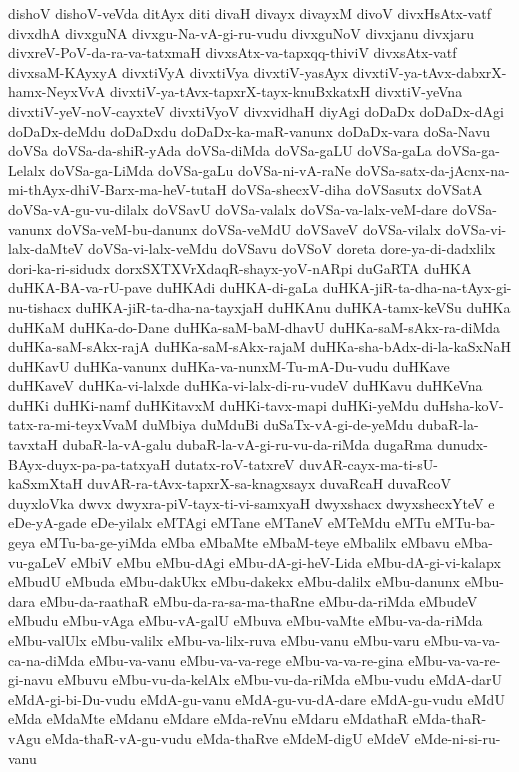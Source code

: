 {dishoV
dishoV-veVda
ditAyx
diti
divaH
divayx
divayxM
divoV
divxHsAtx-vatf
divxdhA
divxguNA
divxgu-Na-vA-gi-ru-vudu
divxguNoV
divxjanu
divxjaru
divxreV-PoV-da-ra-va-tatxmaH
divxsAtx-va-tapxqq-thiviV
divxsAtx-vatf
divxsaM-KAyxyA
divxtiVyA
divxtiVya
divxtiV-yasAyx
divxtiV-ya-tAvx-dabxrX-hamx-NeyxVvA
divxtiV-ya-tAvx-tapxrX-tayx-knuBxkatxH
divxtiV-yeVna
divxtiV-yeV-noV-cayxteV
divxtiVyoV
divxvidhaH
diyAgi
doDaDx
doDaDx-dAgi
doDaDx-deMdu
doDaDxdu
doDaDx-ka-maR-vanunx
doDaDx-vara
doSa-Navu
doVSa
doVSa-da-shiR-yAda
doVSa-diMda
doVSa-gaLU
doVSa-gaLa
doVSa-ga-Lelalx
doVSa-ga-LiMda
doVSa-gaLu
doVSa-ni-vA-raNe
doVSa-satx-da-jAcnx-na-mi-thAyx-dhiV-Barx-ma-heV-tutaH
doVSa-shecxV-diha
doVSasutx
doVSatA
doVSa-vA-gu-vu-dilalx
doVSavU
doVSa-valalx
doVSa-va-lalx-veM-dare
doVSa-vanunx
doVSa-veM-bu-danunx
doVSa-veMdU
doVSaveV
doVSa-vilalx
doVSa-vi-lalx-daMteV
doVSa-vi-lalx-veMdu
doVSavu
doVSoV
doreta
dore-ya-di-dadxlilx
dori-ka-ri-sidudx
dorxSXTXVrXdaqR-shayx-yoV-nARpi
duGaRTA
duHKA
duHKA-BA-va-rU-pave
duHKAdi
duHKA-di-gaLa
duHKA-jiR-ta-dha-na-tAyx-gi-nu-tishacx
duHKA-jiR-ta-dha-na-tayxjaH
duHKAnu
duHKA-tamx-keVSu
duHKa
duHKaM
duHKa-do-Dane
duHKa-saM-baM-dhavU
duHKa-saM-sAkx-ra-diMda
duHKa-saM-sAkx-rajA
duHKa-saM-sAkx-rajaM
duHKa-sha-bAdx-di-la-kaSxNaH
duHKavU
duHKa-vanunx
duHKa-va-nunxM-Tu-mA-Du-vudu
duHKave
duHKaveV
duHKa-vi-lalxde
duHKa-vi-lalx-di-ru-vudeV
duHKavu
duHKeVna
duHKi
duHKi-namf
duHKitavxM
duHKi-tavx-mapi
duHKi-yeMdu
duHsha-koV-tatx-ra-mi-teyxVvaM
duMbiya
duMduBi
duSaTx-vA-gi-de-yeMdu
dubaR-la-tavxtaH
dubaR-la-vA-galu
dubaR-la-vA-gi-ru-vu-da-riMda
dugaRma
dunudx-BAyx-duyx-pa-pa-tatxyaH
dutatx-roV-tatxreV
duvAR-cayx-ma-ti-sU-kaSxmXtaH
duvAR-ra-tAvx-tapxrX-sa-knagxsayx
duvaRcaH
duvaRcoV
duyxloVka
dwvx
dwyxra-piV-tayx-ti-vi-samxyaH
dwyxshacx
dwyxshecxYteV
e
eDe-yA-gade
eDe-yilalx
eMTAgi
eMTane
eMTaneV
eMTeMdu
eMTu
eMTu-ba-geya
eMTu-ba-ge-yiMda
eMba
eMbaMte
eMbaM-teye
eMbalilx
eMbavu
eMba-vu-gaLeV
eMbiV
eMbu
eMbu-dAgi
eMbu-dA-gi-heV-Lida
eMbu-dA-gi-vi-kalapx
eMbudU
eMbuda
eMbu-dakUkx
eMbu-dakekx
eMbu-dalilx
eMbu-danunx
eMbu-dara
eMbu-da-raathaR
eMbu-da-ra-sa-ma-thaRne
eMbu-da-riMda
eMbudeV
eMbudu
eMbu-vAga
eMbu-vA-galU
eMbuva
eMbu-vaMte
eMbu-va-da-riMda
eMbu-valUlx
eMbu-valilx
eMbu-va-lilx-ruva
eMbu-vanu
eMbu-varu
eMbu-va-va-ca-na-diMda
eMbu-va-vanu
eMbu-va-va-rege
eMbu-va-va-re-gina
eMbu-va-va-re-gi-navu
eMbuvu
eMbu-vu-da-kelAlx
eMbu-vu-da-riMda
eMbu-vudu
eMdA-darU
eMdA-gi-bi-Du-vudu
eMdA-gu-vanu
eMdA-gu-vu-dA-dare
eMdA-gu-vudu
eMdU
eMda
eMdaMte
eMdanu
eMdare
eMda-reVnu
eMdaru
eMdathaR
eMda-thaR-vAgu
eMda-thaR-vA-gu-vudu
eMda-thaRve
eMdeM-digU
eMdeV
eMde-ni-si-ru-vanu
}
